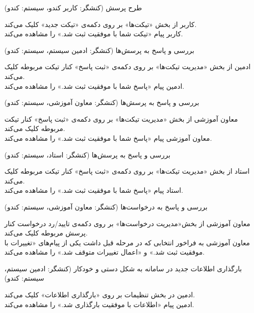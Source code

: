 \documentclass{report}
\begin{document}
\textbf{}
طرح پرسش (کنشگر: کاربر کندو، سیستم: کندو)
\begin{addmargin}[.84cm]{0cm}
کاربر از بخش «تیکت‌ها» بر روی دکمه‌ی «تیکت جدید» کلیک می‌کند.\\
کاربر پیام «تیکت شما با موفقیت ثبت شد.» را مشاهده می‌کند.
\end{addmargin}

\textbf{}
بررسی و پاسخ به پرسش‌ها (کنشگر: ادمین سیستم، سیستم: کندو)
\begin{addmargin}[.84cm]{0cm}
ادمین از بخش «مدیریت تیکت‌ها» بر روی دکمه‌ی «ثبت پاسخ» کنار تیکت مربوطه کلیک می‌کند.\\
ادمین پیام «پاسخ شما با موفقیت ثبت شد.» را مشاهده می‌کند.
\end{addmargin}

\textbf{}
بررسی و پاسخ به پرسش‌ها (کنشگر: معاون آموزشی، سیستم: کندو)
\begin{addmargin}[.84cm]{0cm}
معاون آموزشی از بخش «مدیریت تیکت‌ها» بر روی دکمه‌ی «ثبت پاسخ» کنار تیکت مربوطه کلیک می‌کند.\\
معاون آموزشی پیام «پاسخ شما با موفقیت ثبت شد.» را مشاهده می‌کند.
\end{addmargin}

\textbf{}
بررسی و پاسخ به پرسش‌ها (کنشگر: استاد، سیستم: کندو)
\begin{addmargin}[.84cm]{0cm}
استاد از بخش «مدیریت تیکت‌ها» بر روی دکمه‌ی «ثبت پاسخ» کنار تیکت مربوطه کلیک می‌کند.\\
استاد پیام «پاسخ شما با موفقیت ثبت شد.» را مشاهده می‌کند.
\end{addmargin}

\textbf{}
بررسی و پاسخ به درخواست‌ها (کنشگر: معاون آموزشی، سیستم: کندو)
\begin{addmargin}[.84cm]{0cm}
معاون آموزشی از بخش«مدیریت درخواست‌ها» بر روی دکمه‌ی تایید/رد درخواست کنار پرسش مربوطه کلیک می‌کند.\\
معاون آموزشی به فراخور انتخابی که در مرحله قبل داشت یکی از پیام‌های «تغییرات با موفقیت ثبت شد.» و «اعمال تغییرات متوقف شد.» را مشاهده می‌کند.
\end{addmargin}

\textbf{}
بارگذاری اطلاعات جدید در سامانه به شکل دستی و خودکار (کنشگر: ادمین سیستم، سیستم: کندو)
\begin{addmargin}[.84cm]{0cm}
ادمین در بخش تنظیمات بر روی «بارگذاری اطلاعات» کلیک می‌کند.\\
ادمین پیام «اطلاعات با موفقیت بارگذاری شد.» را مشاهده می‌کند.
\end{addmargin}
\end{document}
